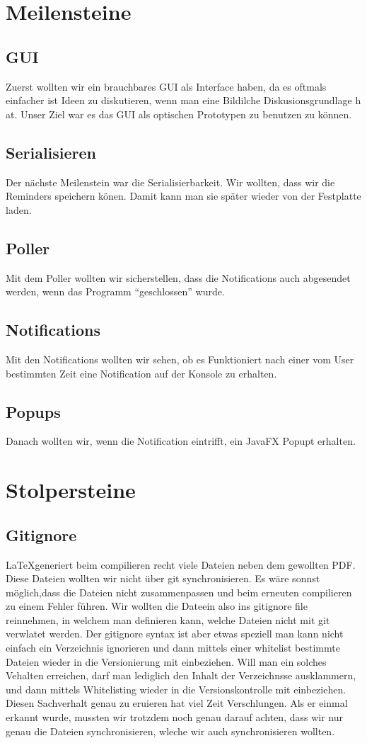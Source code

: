 \documentclass[11pt,titelpage]{scrartcl}
\begin{document}
\section{Meilensteine}
\subsection{GUI}
Zuerst wollten wir ein brauchbares GUI als Interface haben, da es oftmals einfacher ist Ideen zu diskutieren, wenn man eine Bildilche Diskusionsgrundlage h at. Unser Ziel war es das GUI als optischen Prototypen zu benutzen zu können.

\subsection{Serialisieren}
Der nächste Meilenstein war die Serialisierbarkeit. Wir wollten, dass wir die Reminders speichern könen. Damit kann man sie später wieder von der Festplatte laden.
\subsection{Poller}
Mit dem Poller wollten wir sicherstellen, dass die Notifications auch abgesendet werden, wenn das Programm ``geschlossen'' wurde.
\subsection{Notifications}
Mit den Notifications wollten wir sehen, ob es Funktioniert nach einer vom User bestimmten Zeit eine Notification auf der Konsole zu erhalten.
\subsection{Popups}
Danach wollten wir, wenn die Notification eintrifft, ein JavaFX Popupt erhalten.
\section{Stolpersteine}
\subsection{Gitignore}
\LaTeX generiert beim compilieren recht viele Dateien neben dem gewollten PDF. Diese Dateien wollten wir nicht über git synchronisieren. Es wäre sonnst möglich,dass die Dateien nicht zusammenpassen und beim erneuten compilieren zu einem Fehler führen. Wir wollten die Dateein also ins gitignore file reinnehmen, in welchem man definieren kann, welche Dateien nicht mit git verwlatet werden.
Der gitignore syntax ist aber etwas speziell man kann nicht einfach ein  Verzeichnis ignorieren und dann mittels einer whitelist bestimmte Dateien wieder in die Versionierung mit einbeziehen. Will man ein solches Vehalten erreichen, darf man lediglich den Inhalt der Verzeichnsse ausklammern, und dann mittels Whitelisting wieder in die Versionskontrolle mit einbeziehen. Diesen Sachverhalt genau zu eruieren hat viel Zeit Verschlungen. Als er einmal erkannt wurde, mussten wir trotzdem noch genau darauf achten, dass wir nur genau die Dateien synchronisieren, wleche wir auch synchronisieren wollten.
\end{document}
